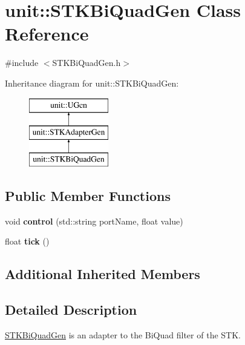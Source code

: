 \hypertarget{classunit_1_1STKBiQuadGen}{}\section{unit\+:\+:S\+T\+K\+Bi\+Quad\+Gen Class Reference}
\label{classunit_1_1STKBiQuadGen}


{\ttfamily \#include $<$S\+T\+K\+Bi\+Quad\+Gen.\+h$>$}

Inheritance diagram for unit\+:\+:S\+T\+K\+Bi\+Quad\+Gen\+:\begin{figure}[H]
\begin{center}
\leavevmode
\includegraphics[height=3.000000cm]{classunit_1_1STKBiQuadGen}
\end{center}
\end{figure}
\subsection*{Public Member Functions}
\begin{DoxyCompactItemize}
\item 
void {\bfseries control} (std\+::string port\+Name, float value)\hypertarget{classunit_1_1STKBiQuadGen_afbaea4e23ab453fdeaa0069ddd8002a6}{}\label{classunit_1_1STKBiQuadGen_afbaea4e23ab453fdeaa0069ddd8002a6}

\item 
float {\bfseries tick} ()\hypertarget{classunit_1_1STKBiQuadGen_aeaa64c8ff587d9a9089b4cf3276255b9}{}\label{classunit_1_1STKBiQuadGen_aeaa64c8ff587d9a9089b4cf3276255b9}

\end{DoxyCompactItemize}
\subsection*{Additional Inherited Members}


\subsection{Detailed Description}
\hyperlink{classunit_1_1STKBiQuadGen}{S\+T\+K\+Bi\+Quad\+Gen} is an adapter to the Bi\+Quad filter of the S\+TK.

